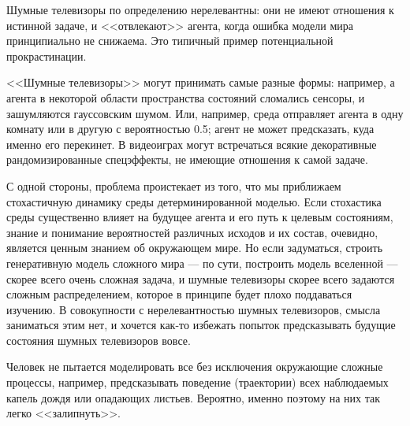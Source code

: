 Шумные телевизоры по определению нерелевантны: они не имеют отношения к истинной задаче, и <<отвлекают>> агента, когда ошибка модели мира принципиально не снижаема. Это типичный пример потенциальной прокрастинации.

\begin{example}
<<Шумные телевизоры>> могут принимать самые разные формы: например, а агента в некоторой области пространства состояний сломались сенсоры, и зашумляются гауссовским шумом. Или, например, среда отправляет агента в одну комнату или в другую с вероятностью 0.5; агент не может предсказать, куда именно его перекинет. В видеоиграх могут встречаться всякие декоративные рандомизированные спецэффекты, не имеющие отношения к самой задаче.
\end{example}

С одной стороны, проблема проистекает из того, что мы приближаем стохастичную динамику среды детерминированной моделью. Если стохастика среды существенно влияет на будущее агента и его путь к целевым состояниям, знание и понимание вероятностей различных исходов и их состав, очевидно, является ценным знанием об окружающем мире. Но если задуматься, строить генеративную модель сложного мира --- по сути, построить модель вселенной --- скорее всего очень сложная задача, и шумные телевизоры скорее всего задаются сложным распределением, которое в принципе будет плохо поддаваться изучению. В совокупности с нерелевантностью шумных телевизоров, смысла заниматься этим нет, и хочется как-то избежать попыток предсказывать будущие состояния шумных телевизоров вовсе.

\begin{example}
Человек не пытается моделировать все без исключения окружающие сложные процессы, например, предсказывать поведение (траектории) всех наблюдаемых капель дождя или опадающих листьев. Вероятно, именно поэтому на них так легко <<залипнуть>>.
\end{example}


